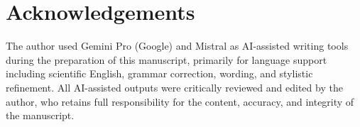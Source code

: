 \documentclass{acmsiggraph}
\begin{document}
	\section*{Acknowledgements}
	
	The author used Gemini Pro (Google) and Mistral as AI-assisted writing
	tools during the preparation of this manuscript, primarily for language
	support including scientific English, grammar correction, wording, and
	stylistic refinement. All AI-assisted outputs were critically reviewed
	and edited by the author, who retains full responsibility for the
	content, accuracy, and integrity of the manuscript.
	

	
	
	
\end{document}
